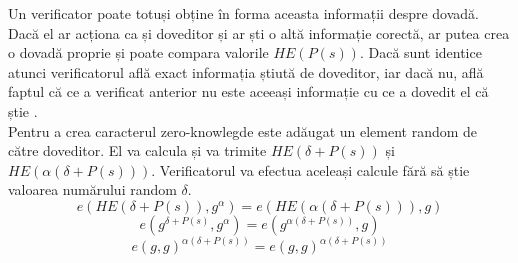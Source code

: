 \clearpage

Un verificator poate totuși obține în forma aceasta informații despre dovadă. Dacă el ar acționa ca și doveditor și ar ști o altă informație corectă, ar putea crea o dovadă proprie și poate compara valorile $HE(P(s))$. Dacă sunt identice atunci verificatorul află exact informația știută de doveditor, iar dacă nu, află faptul că ce a verificat anterior nu este aceeași informație cu ce a dovedit el că știe \cite{ZKS_Crypto_Basic3}.\\

Pentru a crea caracterul zero-knowlegde este adăugat un element random de către doveditor. El va calcula și va trimite
$HE(\delta + P(s))$ și $HE(\alpha(\delta + P(s)))$. Verificatorul va efectua aceleași calcule fără să știe valoarea numărului random $\delta$.
\[ e(HE(\delta + P(s)), g^{\alpha}) = e(HE(\alpha(\delta + P(s))), g) \]
\[ e(g^{\delta + P(s)}, g^{\alpha}) = e(g^{\alpha(\delta + P(s))}, g) \]
\[ e(g,g)^{\alpha(\delta + P(s))} = e(g,g)^{\alpha(\delta + P(s))} \]
